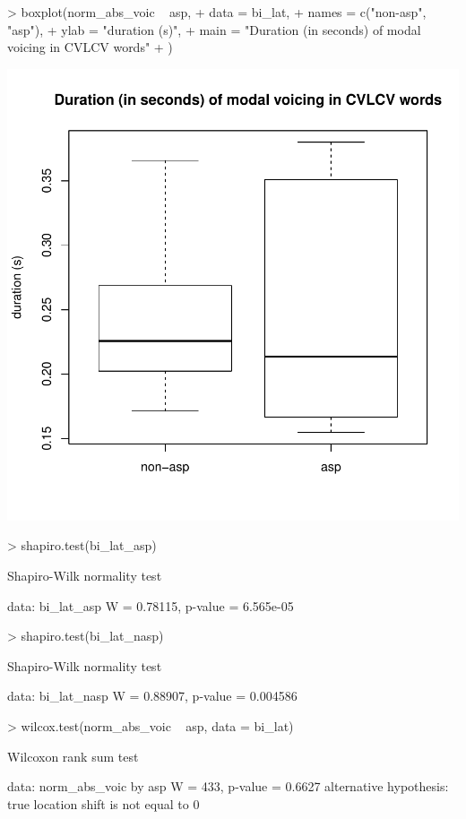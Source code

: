 \documentclass[a4paper,11pt]{article}
\begin{document}
\begin{Schunk}
\begin{Sinput}
> boxplot(norm_abs_voic ~ asp,
+         data = bi_lat,
+         names = c("non-asp", "asp"),
+         ylab = "duration (s)",
+         main = "Duration (in seconds) of modal voicing in CVLCV words"
+         )
\end{Sinput}
\end{Schunk}
\includegraphics{analysis-029}

\begin{Schunk}
\begin{Sinput}
> shapiro.test(bi_lat_asp)
\end{Sinput}
\begin{Soutput}
	Shapiro-Wilk normality test

data:  bi_lat_asp
W = 0.78115, p-value = 6.565e-05
\end{Soutput}
\begin{Sinput}
> shapiro.test(bi_lat_nasp)
\end{Sinput}
\begin{Soutput}
	Shapiro-Wilk normality test

data:  bi_lat_nasp
W = 0.88907, p-value = 0.004586
\end{Soutput}
\begin{Sinput}
> wilcox.test(norm_abs_voic ~ asp, data = bi_lat)
\end{Sinput}
\begin{Soutput}
	Wilcoxon rank sum test

data:  norm_abs_voic by asp
W = 433, p-value = 0.6627
alternative hypothesis: true location shift is not equal to 0
\end{Soutput}
\end{Schunk}
\end{document}
